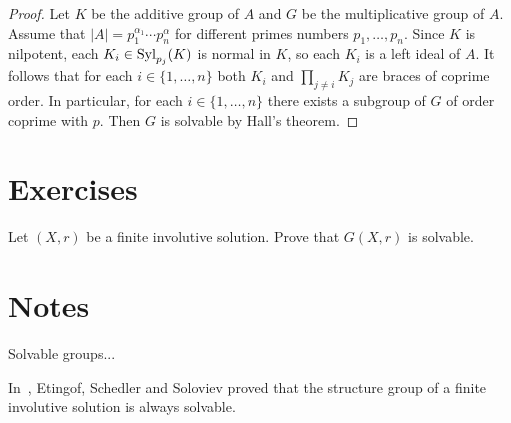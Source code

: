 \begin{proof}
    Let $K$ be the additive group of $A$ and $G$ be the multiplicative group of $A$. Assume
    that $|A|=p_1^{\alpha_1}\cdots p_n^{\alpha}$ for different primes numbers $p_1,\dots,p_n$. 
    Since $K$ is nilpotent, each $K_i\in\mathrm{Syl}_{p_j}(K)$ is normal in $K$, so 
    each $K_i$ is a left ideal of $A$. It follows that for each $i\in\{1,\dots,n\}$ both $K_i$ and 
    $\prod_{j\ne i}K_j$ are braces of coprime order. In particular, for 
    each $i\in\{1,\dots,n\}$ there exists a subgroup of $G$ of order coprime with $p$. 
    Then $G$ is solvable by Hall's theorem. 
\end{proof}








\section*{Exercises}

\begin{prob}
\label{prob:G(X,r)solvable}
Let $(X,r)$ be a finite involutive solution. Prove that $G(X,r)$ is solvable. 
\end{prob}


\section*{Notes}

Solvable groups...

In~\cite{MR1722951}, Etingof, Schedler and Soloviev proved that the structure group of a finite involutive
solution is always solvable. 

